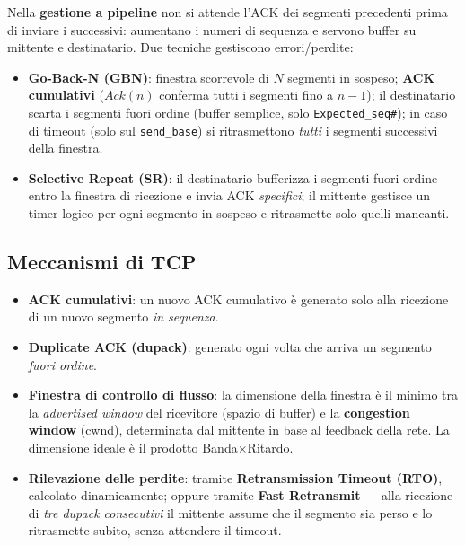 Nella \textbf{gestione a pipeline} non si attende l'ACK dei segmenti precedenti prima di inviare i successivi: aumentano i numeri di sequenza e servono buffer su mittente e destinatario. Due tecniche gestiscono errori/perdite:
\begin{itemize}
    \item \textbf{Go-Back-N (GBN)}: finestra scorrevole di $N$ segmenti in sospeso; \textbf{ACK cumulativi} ($Ack(n)$ conferma tutti i segmenti fino a $n-1$); il destinatario scarta i segmenti fuori ordine (buffer semplice, solo \texttt{Expected\_seq\#}); in caso di timeout (solo sul \texttt{send\_base}) si ritrasmettono \emph{tutti} i segmenti successivi della finestra.
    \item \textbf{Selective Repeat (SR)}: il destinatario bufferizza i segmenti fuori ordine entro la finestra di ricezione e invia ACK \emph{specifici}; il mittente gestisce un timer logico per ogni segmento in sospeso e ritrasmette solo quelli mancanti.
\end{itemize}


\subsection{Meccanismi di TCP}
\begin{itemize}
    \item \textbf{ACK cumulativi}: un nuovo ACK cumulativo è generato solo alla ricezione di un nuovo segmento \emph{in sequenza}.
    \item \textbf{Duplicate ACK (dupack)}: generato ogni volta che arriva un segmento \emph{fuori ordine}.
    \item \textbf{Finestra di controllo di flusso}: la dimensione della finestra è il minimo tra la \textit{advertised window} del ricevitore (spazio di buffer) e la \textbf{congestion window} (cwnd), determinata dal mittente in base al feedback della rete. La dimensione ideale è il prodotto Banda$\times$Ritardo.
    \item \textbf{Rilevazione delle perdite}: tramite \textbf{Retransmission Timeout (RTO)}, calcolato dinamicamente; oppure tramite \textbf{Fast Retransmit} — alla ricezione di \emph{tre dupack consecutivi} il mittente assume che il segmento sia perso e lo ritrasmette subito, senza attendere il timeout.
\end{itemize}

